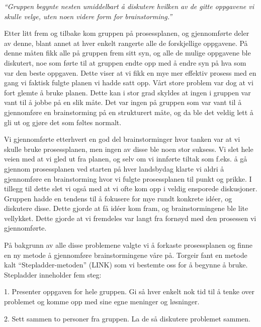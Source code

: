 \emph{“Gruppen begynte nesten umiddelbart å diskutere hvilken av de gitte oppgavene vi skulle velge, uten noen videre form for brainstorming.”} \newline

Etter litt frem og tilbake kom gruppen på prosessplanen, og gjennomførte deler av denne, blant annet at hver enkelt rangerte alle de forskjellige oppgavene. På denne måten fikk alle på gruppen frem sitt syn, og alle de mulige oppgavene ble diskutert, noe som førte til at gruppen endte opp med å endre syn på hva som var den beste oppgaven. Dette viser at vi fikk en mye mer effektiv prosess med en gang vi faktisk fulgte planen vi hadde satt opp. Vårt store problem var dog at vi fort glemte å bruke planen. Dette kan i stor grad skyldes at ingen i gruppen var vant til å jobbe på en slik måte. Det var ingen på gruppen som var vant til å gjennomføre en brainstorming på en strukturert måte, og da ble det veldig lett å gli ut og gjøre det som føltes normalt. \newline

Vi gjennomførte etterhvert en god del brainstorminger hvor tanken var at vi skulle bruke prosessplanen, men ingen av disse ble noen stor suksess. Vi slet hele veien med at vi gled ut fra planen, og selv om vi innførte tiltak som f.eks. å gå gjennom prosessplanen ved starten på hver landsbydag klarte vi aldri å gjennomføre en brainstorming hvor vi fulgte prosessplanen til punkt og prikke. I tillegg til dette slet vi også med at vi ofte kom opp i veldig ensporede diskusjoner. Gruppen hadde en tendens til å fokusere for mye rundt konkrete idéer, og diskutere disse. Dette gjorde at få idéer kom fram, og brainstormingene ble lite vellykket. Dette gjorde at vi fremdeles var langt fra fornøyd med den prosessen vi gjennomførte. \newline

På bakgrunn av alle disse problemene valgte vi å forkaste prosessplanen og finne en ny metode å gjennomføre brainstormingene våre på. Torgeir fant en metode kalt “Stepladder-metoden” (LINK) som vi bestemte oss for å begynne å bruke. Stepladder inneholder fem steg: \newline

1. Presenter oppgaven for hele gruppen. Gi så hver enkelt nok tid til å tenke over problemet og komme opp med sine egne meninger og løsninger.\newline

2. Sett sammen to personer fra gruppen. La de så diskutere problemet sammen.\newline

